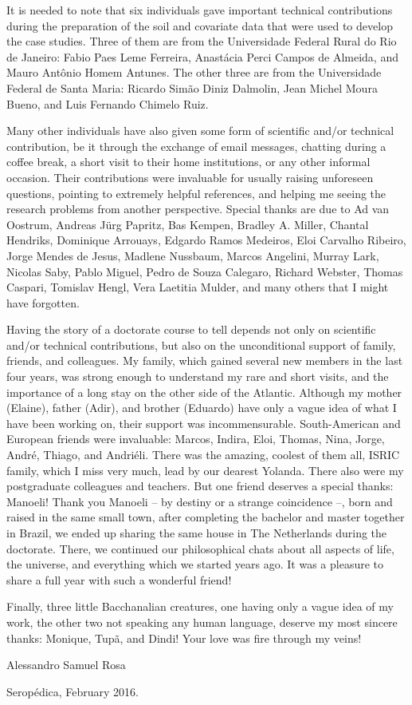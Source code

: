 It is needed to note that six individuals gave important technical contributions during the preparation of 
the soil and covariate data that were used to develop the case studies. Three of them are from the 
Universidade 
Federal Rural do Rio de Janeiro: Fabio Paes Leme Ferreira, Anastácia Perci Campos de Almeida, and Mauro 
Antônio 
Homem Antunes. The other three are from the Universidade Federal de Santa Maria: Ricardo Simão Diniz Dalmolin, 
Jean Michel Moura Bueno, and Luis Fernando Chimelo Ruiz.

Many other individuals have also given some form of scientific and/or technical contribution, be it through 
the exchange of email messages, chatting during a coffee break, a short visit to their home institutions, or 
any other informal occasion. Their contributions were invaluable for usually raising unforeseen questions, 
pointing to extremely helpful references, and helping me seeing the research problems from another perspective.
Special thanks are due to Ad van Oostrum, Andreas Jürg Papritz, Bas Kempen, Bradley A. Miller, Chantal 
Hendriks, Dominique Arrouays, Edgardo Ramos Medeiros, Eloi Carvalho Ribeiro, Jorge Mendes de Jesus, Madlene 
Nussbaum, Marcos Angelini, Murray Lark, Nicolas Saby, Pablo Miguel, Pedro de Souza Calegaro, Richard Webster, 
Thomas Caspari, Tomislav Hengl, Vera Laetitia Mulder, and many others that I might have forgotten.

Having the story of a doctorate course to tell depends not only on scientific and/or technical contributions,
but also on the unconditional support of family, friends, and colleagues. My family, which gained several new 
members in the last four years, was strong enough to understand my rare and short visits, and the importance 
of 
a long stay on the other side of the Atlantic. Although my mother (Elaine), father (Adir), and brother 
(Eduardo) have only a vague idea of what I have been working on, their support was incommensurable. 
South-American and European friends were invaluable: Marcos, Indira, Eloi, Thomas, Nina, Jorge, André, Thiago, 
and Andriéli. There was the amazing, coolest of them all, ISRIC family, which I miss very much, lead by 
our dearest Yolanda. There also were my postgraduate colleagues and teachers. But one friend deserves a special 
thanks: 
Manoeli! Thank you Manoeli -- by destiny or a strange coincidence --, born and raised in the same small town, 
after completing the bachelor and master together in Brazil, we ended up sharing the same house in The 
Netherlands during the doctorate. There, we continued our philosophical chats about all aspects of life, the 
universe, and everything which we started years ago. It was a pleasure to share a full year with such a 
wonderful friend!

Finally, three little Bacchanalian creatures, one having only a vague idea of my work, the other two not 
speaking any human language, deserve my most sincere thanks: Monique, Tupã, and Dindi! Your love was fire 
through 
my veins!

\begin{flushright}
 Alessandro Samuel Rosa
 
 Seropédica, February 2016.
\end{flushright}


